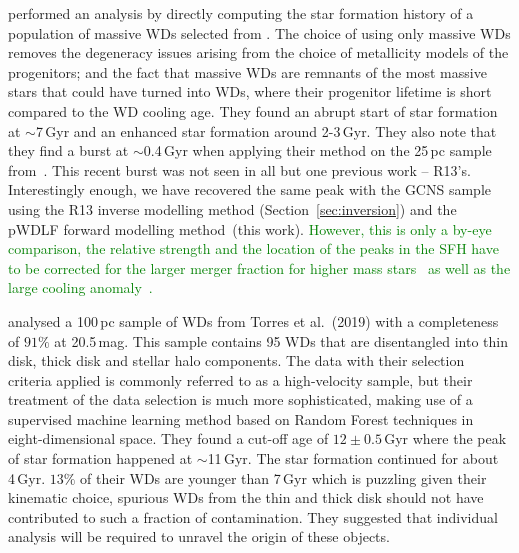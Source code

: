 \documentclass[fleqn,usenatbib]{mnras}
\begin{document}
\citet{2019ApJ...878L..11I} performed an analysis by directly
computing the star formation history of a population of massive WDs selected
from \citet{2019Natur.565..202T}. The choice of using only massive WDs
removes the degeneracy issues arising from the choice of metallicity models
of the progenitors; and the fact that massive WDs are remnants of the most
massive stars that could have turned into WDs, where their progenitor lifetime
is short compared to the WD cooling age. They found an abrupt start of star
formation at $\sim$7\,Gyr and an enhanced star formation around 2-3\,Gyr. They
also note that they find a burst at $\sim$0.4\,Gyr when applying their method
on the 25\,pc sample from~\citet{2017ASPC..509...59O}. This recent burst was not
seen in all but one previous work -- R13's. Interestingly enough, we have
recovered the same peak with the GCNS sample using the R13 inverse
modelling method (Section~\ref{sec:inversion}) and the pWDLF forward modelling
method~(this work). \textcolor{green}{However, this is only a by-eye comparison,
the relative strength and the location of the peaks in the SFH have to be
corrected for the larger merger fraction for higher mass stars~\citep{2020A&A...636A..31T, 2024ApJ...974...12J} as well as the large
cooling anomaly~\citep{2019ApJ...886..100C, 2024Natur.627..286B}.
}

\citet{2021MNRAS.502.1753T} analysed a 100\,pc sample of WDs from
Torres et al.~(2019) with a completeness of $91\%$ at 20.5\,mag. This sample
contains 95 WDs that are disentangled into thin disk, thick disk and stellar
halo components. The data with their selection criteria applied is commonly
referred to as a high-velocity sample, but their treatment of the data
selection is much more sophisticated, making use of a supervised
machine learning method based on Random Forest techniques in eight-dimensional
space. They found a cut-off age of $12\pm0.5$\,Gyr where the peak of star
formation happened at $\sim$11\,Gyr. The star formation continued for about
4\,Gyr. $13\%$ of their WDs are younger than 7\,Gyr which is puzzling given
their kinematic choice, spurious WDs from the thin and thick disk should not
have contributed to such a fraction of contamination. They suggested that
individual analysis will be required to unravel the origin of these objects.

\end{document}
